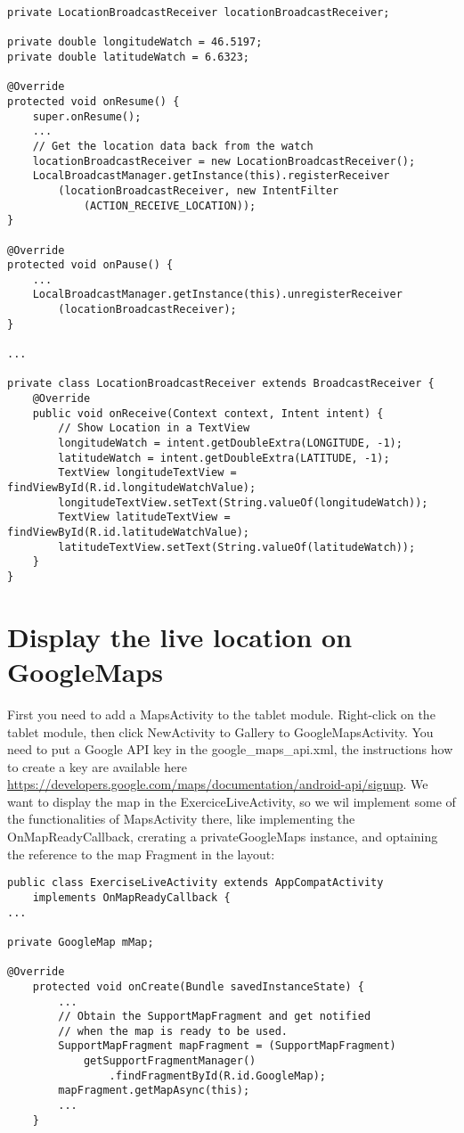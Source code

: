 \documentclass[11pt]{article}
\begin{document}
\begin{lstlisting}
private LocationBroadcastReceiver locationBroadcastReceiver;

private double longitudeWatch = 46.5197;
private double latitudeWatch = 6.6323;

@Override
protected void onResume() {
    super.onResume();
    ...
    // Get the location data back from the watch
    locationBroadcastReceiver = new LocationBroadcastReceiver();
    LocalBroadcastManager.getInstance(this).registerReceiver
        (locationBroadcastReceiver, new IntentFilter
            (ACTION_RECEIVE_LOCATION));
}

@Override
protected void onPause() {
    ...
    LocalBroadcastManager.getInstance(this).unregisterReceiver
        (locationBroadcastReceiver);
}

...

private class LocationBroadcastReceiver extends BroadcastReceiver {
    @Override
    public void onReceive(Context context, Intent intent) {
        // Show Location in a TextView
        longitudeWatch = intent.getDoubleExtra(LONGITUDE, -1);
        latitudeWatch = intent.getDoubleExtra(LATITUDE, -1);
        TextView longitudeTextView = findViewById(R.id.longitudeWatchValue);
        longitudeTextView.setText(String.valueOf(longitudeWatch));
        TextView latitudeTextView = findViewById(R.id.latitudeWatchValue);
        latitudeTextView.setText(String.valueOf(latitudeWatch));
    }
}
\end{lstlisting}

\section{Display the live location on GoogleMaps}
First you need to add a MapsActivity to the tablet module. Right-click on the tablet module, then click NewActivity to Gallery to GoogleMapsActivity.
You need to put a Google API key in the google\_maps\_api.xml, the instructions how to create a key are available here \url{https://developers.google.com/maps/documentation/android-api/signup}.
We want to display the map in the ExerciceLiveActivity, so we wil implement some of the functionalities of MapsActivity there, like implementing the OnMapReadyCallback, crerating a privateGoogleMaps instance, and optaining the reference to the map Fragment in the layout:
\begin{lstlisting}
public class ExerciseLiveActivity extends AppCompatActivity
    implements OnMapReadyCallback {
...

private GoogleMap mMap;

@Override
    protected void onCreate(Bundle savedInstanceState) {
        ...
        // Obtain the SupportMapFragment and get notified
        // when the map is ready to be used.
        SupportMapFragment mapFragment = (SupportMapFragment)
            getSupportFragmentManager()
                .findFragmentById(R.id.GoogleMap);
        mapFragment.getMapAsync(this);
        ...
    }
\end{lstlisting}
\end{document}
